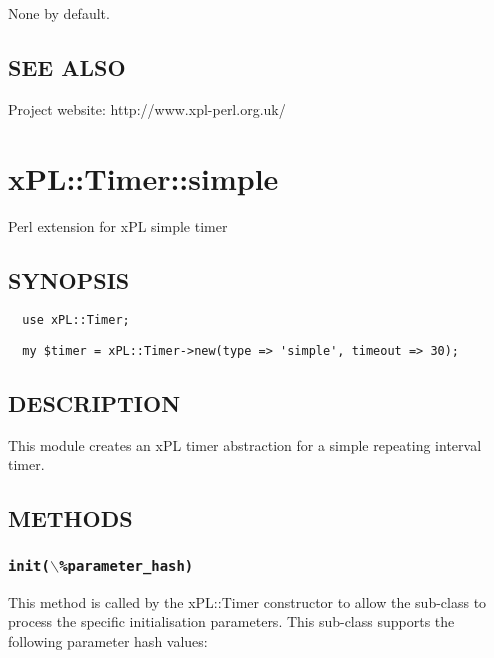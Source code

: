 None by default.

\subsection*{SEE ALSO\label{xPL::Timer::recurrence_SEE_ALSO}}


Project website: http://www.xpl-perl.org.uk/

\section{xPL::Timer::simple\label{xPL::Timer::simple}}


Perl extension for xPL simple timer

\subsection*{SYNOPSIS\label{xPL::Timer::simple_SYNOPSIS}}
\begin{verbatim}
  use xPL::Timer;
\end{verbatim}
\begin{verbatim}
  my $timer = xPL::Timer->new(type => 'simple', timeout => 30);
\end{verbatim}
\subsection*{DESCRIPTION\label{xPL::Timer::simple_DESCRIPTION}}


This module creates an xPL timer abstraction for a simple repeating
interval timer.

\subsection*{METHODS\label{xPL::Timer::simple_METHODS}}
\subsubsection*{\texttt{init($\backslash$\%parameter\_hash)}\label{xPL::Timer::simple_init_backslash_parameter_hash_}}


This method is called by the xPL::Timer constructor to allow the
sub-class to process the specific initialisation parameters.  This
sub-class supports the following parameter hash values:

